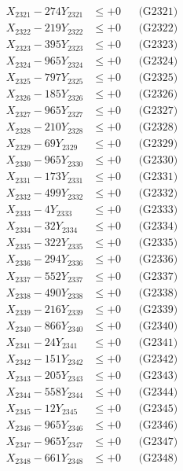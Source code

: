 \documentclass[a4paper,10pt]{article}
\begin{document}
{\begin{align}
\allowbreak
X_{2321} - 274Y_{2321} &\leq +0 && \text{(G2321)} \\
X_{2322} - 219Y_{2322} &\leq +0 && \text{(G2322)} \\
X_{2323} - 395Y_{2323} &\leq +0 && \text{(G2323)} \\
X_{2324} - 965Y_{2324} &\leq +0 && \text{(G2324)} \\
X_{2325} - 797Y_{2325} &\leq +0 && \text{(G2325)} \\
X_{2326} - 185Y_{2326} &\leq +0 && \text{(G2326)} \\
X_{2327} - 965Y_{2327} &\leq +0 && \text{(G2327)} \\
X_{2328} - 210Y_{2328} &\leq +0 && \text{(G2328)} \\
X_{2329} - 69Y_{2329} &\leq +0 && \text{(G2329)} \\
X_{2330} - 965Y_{2330} &\leq +0 && \text{(G2330)} \\
\allowbreak
X_{2331} - 173Y_{2331} &\leq +0 && \text{(G2331)} \\
X_{2332} - 499Y_{2332} &\leq +0 && \text{(G2332)} \\
X_{2333} - 4Y_{2333} &\leq +0 && \text{(G2333)} \\
X_{2334} - 32Y_{2334} &\leq +0 && \text{(G2334)} \\
X_{2335} - 322Y_{2335} &\leq +0 && \text{(G2335)} \\
X_{2336} - 294Y_{2336} &\leq +0 && \text{(G2336)} \\
X_{2337} - 552Y_{2337} &\leq +0 && \text{(G2337)} \\
X_{2338} - 490Y_{2338} &\leq +0 && \text{(G2338)} \\
X_{2339} - 216Y_{2339} &\leq +0 && \text{(G2339)} \\
X_{2340} - 866Y_{2340} &\leq +0 && \text{(G2340)} \\
\allowbreak
X_{2341} - 24Y_{2341} &\leq +0 && \text{(G2341)} \\
X_{2342} - 151Y_{2342} &\leq +0 && \text{(G2342)} \\
X_{2343} - 205Y_{2343} &\leq +0 && \text{(G2343)} \\
X_{2344} - 558Y_{2344} &\leq +0 && \text{(G2344)} \\
X_{2345} - 12Y_{2345} &\leq +0 && \text{(G2345)} \\
X_{2346} - 965Y_{2346} &\leq +0 && \text{(G2346)} \\
X_{2347} - 965Y_{2347} &\leq +0 && \text{(G2347)} \\
X_{2348} - 661Y_{2348} &\leq +0 && \text{(G2348)} \\

\end{align}}
\end{document}
